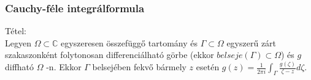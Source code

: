 \documentclass[12pt,a4paper]{scrartcl}
\newenvironment{tetel}{}{}
\begin{document}
\hypertarget{cauchy-fele-integralformula}{%
\subsubsection{Cauchy-féle
integrálformula}\label{cauchy-fele-integralformula}}

\begin{tetel}

Tétel:\\
Legyen \(\Omega \subset {\mathbb{C}}\) egyszeresen összefüggő tartomány
és \(\Gamma \subset \Omega\) egyszerű zárt szakaszonként folytonosan
differenciálható görbe (ekkor
\({belseje}\left( \Gamma \right) \subset \Omega\)) és \(g\) diffható
\(\Omega\) -n. Ekkor \(\Gamma\) belsejében fekvő bármely \(z\) esetén
\(g\left( z \right) = \frac{1}{2\pi i}{\int_{\Gamma}{\frac{g\left( \zeta \right)}{\zeta - z}d\zeta}}\).

\end{tetel}
\end{document}
